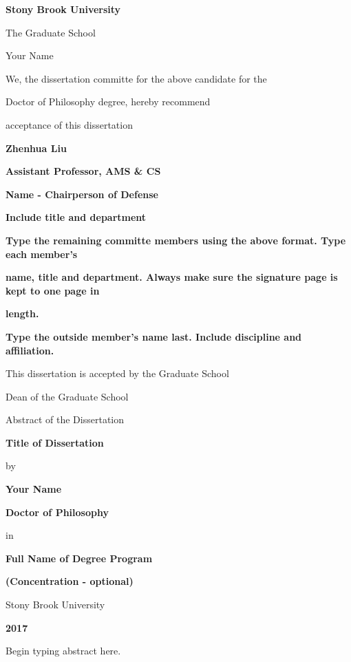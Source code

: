 \documentclass[12pt]{article}
\begin{document}
\centerline{\bf{Stony Brook University}}
\vspace*{1\baselineskip}
\centerline{The Graduate School}
\vspace*{2\baselineskip}
\centerline{Your Name}
\vspace*{2\baselineskip}
\centerline{We, the dissertation committe for the above candidate for the}
\vspace*{1\baselineskip}
\centerline{Doctor of Philosophy degree, hereby recommend}
\vspace*{1\baselineskip}
\centerline{acceptance of this dissertation}
\vspace*{2\baselineskip}
\centerline{\bf{Zhenhua Liu}}
\centerline{\bf{Assistant Professor, AMS \& CS}}
\vspace*{2\baselineskip}
\centerline{\bf{Name - Chairperson of Defense}}
\centerline{\bf{Include title and department}}
\vspace*{2\baselineskip}
\centerline{\bf{Type the remaining committe members using the above format. Type each member's}}
\centerline{\bf{name, title and department. Always make sure the signature page is kept to one page in}} 
\centerline{\bf{length.}}
\vspace*{1\baselineskip}
\centerline{\bf{Type the outside member's name last. Include discipline and affiliation.}}
\vspace*{2\baselineskip}
\centerline{This dissertation is accepted by the Graduate School}
\vspace*{3\baselineskip}
\centerline{Dean of the Graduate School}

\newpage

\centerline{Abstract of the Dissertation}
\vspace*{1\baselineskip}
\centerline{\bf{Title of Dissertation}}
\vspace*{1\baselineskip}
\centerline{by}
\vspace*{1\baselineskip}
\centerline{\bf{Your Name}}
\vspace*{1\baselineskip}
\centerline{\bf{Doctor of Philosophy}}
\vspace*{1\baselineskip}
\centerline{in}
\vspace*{1\baselineskip}
\centerline{\bf{Full Name of Degree Program}}
\vspace*{1\baselineskip}
\centerline{\bf{(Concentration - optional)}}
\vspace*{1\baselineskip}
\centerline{Stony Brook University}
\vspace*{1\baselineskip}
\centerline{\bf{2017}}
\vspace*{2\baselineskip}
Begin typing abstract here.
\end{document}

